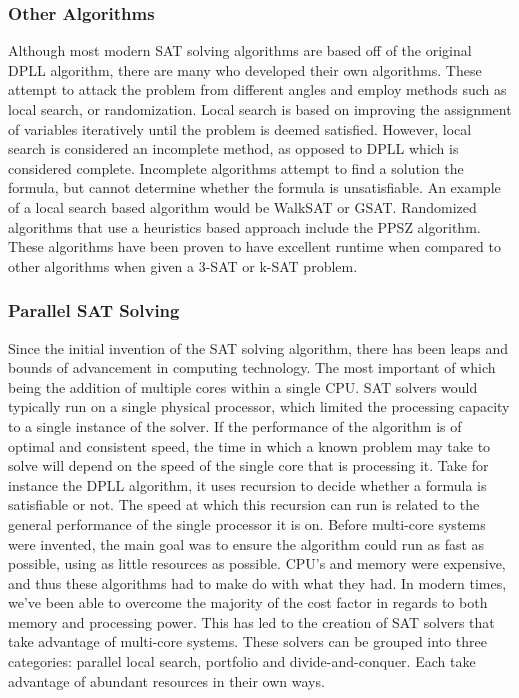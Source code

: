 \documentclass{article}
\begin{document}
    \subsubsection{Other Algorithms}
    Although most modern SAT solving algorithms are based off of the original DPLL algorithm, there are many who developed their own
    algorithms. These attempt to attack the problem from different angles and employ methods such as local search, or randomization.
    Local search is based on improving the assignment of variables iteratively until the problem is deemed satisfied. However, local search
    is considered an incomplete method, as opposed to DPLL which is considered complete. Incomplete algorithms attempt to find a solution
    the formula, but cannot determine whether the formula is unsatisfiable. An example of a local search based algorithm would be WalkSAT or
    GSAT. Randomized algorithms that use a heuristics based approach include the PPSZ algorithm. These algorithms have been proven to have
    excellent runtime when compared to other algorithms when given a 3-SAT or k-SAT problem\cite{ppsz}.

    \subsubsection{Parallel SAT Solving}
    Since the initial invention of the SAT solving algorithm, there has been leaps and bounds of advancement in computing technology. The
    most important of which being the addition of multiple cores within a single CPU. SAT solvers would typically run on a single physical
    processor, which limited the processing capacity to a single instance of the solver. If the performance of the algorithm is of optimal
    and consistent speed, the time in which a known problem may take to solve will depend on the speed of the single core that is processing
    it. Take for instance the DPLL algorithm, it uses recursion to decide whether a formula is satisfiable or not. The speed at which this
    recursion can run is related to the general performance of the single processor it is on. Before multi-core systems were invented,
    the main goal was to ensure the algorithm could run as fast as possible, using as little resources as possible. CPU's and memory were
    expensive, and thus these algorithms had to make do with what they had. In modern times, we've been able to overcome the majority of the
    cost factor in regards to both memory and processing power. This has led to the creation of SAT solvers that take advantage of
    multi-core systems. These solvers can be grouped into three categories: parallel local search, portfolio and divide-and-conquer. Each
    take advantage of abundant resources in their own ways.
\end{document}
